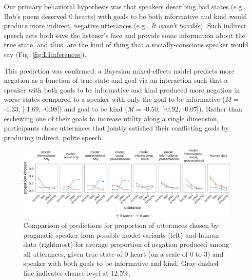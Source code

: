 \documentclass[9pt,twocolumn,twoside,lineno]{main_class_file}
\begin{document}
Our primary behavioral hypothesis was that speakers describing bad
states (e.g., Bob's poem deserved 0 hearts) with goals to be both
informative and kind would produce more indirect, negative utterances
(e.g., \emph{It wasn't terrible}). Such indirect speech acts both
save the listener's face and provide some information about the
true state, and thus, are the kind of thing that a socially-conscious speaker would say (Fig. \ref{fig:L1inferences}).

This prediction was confirmed: a Bayesian mixed-effects
model predicts more negation as a function of true state and goal via
an interaction such that a speaker with both goals to be informative and
kind produced more negation in worse states compared to a speaker with
only the goal to be informative (\emph{M} = -1.33, {[}-1.69, -0.98{]})
and goal to be kind (\emph{M} = -0.50, {[}-0.92, -0.07{]}). Rather than
eschewing one of their goals to increase utility along a single
dimension, participants chose utterances that jointly satisfied their
conflicting goals by producing indirect, polite speech.

\begin{figure}[!h]
\includegraphics[width=\textwidth]{fig/comparison-1} \caption{Comparison of predictions for proportion of utterances chosen by pragmatic speaker from possible model variants (left) and human data (rightmost) for average proportion of negation produced among all utterances, given true state of 0 heart (on a scale of 0 to 3) and speaker with both goals to be informative and kind. Gray dashed line indicates chance level at 12.5\%.}\label{fig:comparison}
\end{figure}
\end{document}

